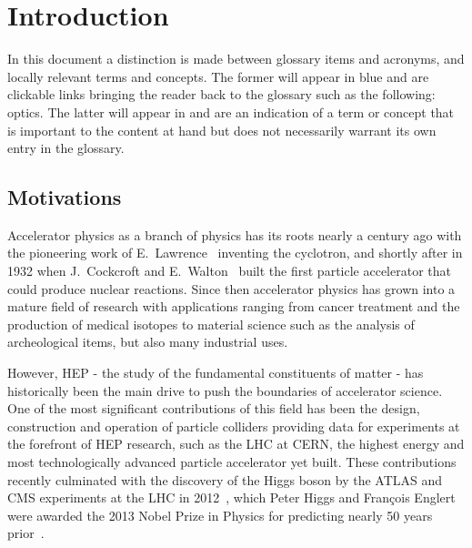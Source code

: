 \chapter{Introduction}
\label{chapter:introduction}

\begin{noteblock}
    In this document a distinction is made between glossary items and acronyms, and locally relevant terms and concepts.
    The former will appear in \textcolor{cern}{blue} and are clickable links bringing the reader back to the glossary such as the following: \gls{optics}.
    The latter will appear in  and are an indication of a term or concept that is important to the content at hand but does not necessarily warrant its own entry in the glossary.
\end{noteblock}

\section{Motivations}

Accelerator physics as a branch of physics has its roots nearly a century ago with the pioneering work of E.~Lawrence~\cite{PR:Lawrence:Production_High_Speed_Light_Ions} inventing the cyclotron, and shortly after in \num{1932} when J.~Cockcroft and E.~Walton~\cite{LLC:Cockcroft:Disintegration_Lithium_Swift_Protons,TRS:Cockcroft:Experiments_High_Velocity_Positive_Ions_1,TRS:Cockcroft:Experiments_High_Velocity_Positive_Ions_2} built the first particle accelerator that could produce nuclear reactions.
Since then accelerator physics has grown into a mature field of research with applications ranging from cancer treatment and the production of medical isotopes to material science such as the analysis of archeological items, but also many industrial uses.

However, \gls{HEP} - the study of the fundamental constituents of matter - has historically been the main drive to push the boundaries of accelerator science.
One of the most significant contributions of this field has been the design, construction and operation of particle colliders providing data for experiments at the forefront of \gls{HEP} research, such as the \gls{LHC} at \acrshort{CERN}, the highest energy and most technologically advanced particle accelerator yet built.
These contributions recently culminated with the discovery of the Higgs boson by the \acrshort{ATLAS} and \acrshort{CMS} experiments at the \acrshort{LHC} in \num{2012}~\cite{PLB:ATLAS:Observation_Higgs_Boson, PLB:CMS:Observation_Higgs_Boson}, which Peter Higgs and François Englert were awarded the \num{2013} Nobel Prize in Physics for predicting nearly \num{50} years prior~\cite{PRL:Higgs:Broken_Symmetries_Masses_Gauge_Bosons,PRL:Englert:Broken_Symmetry_Mass_Gauge_Vector_Mesons}.

